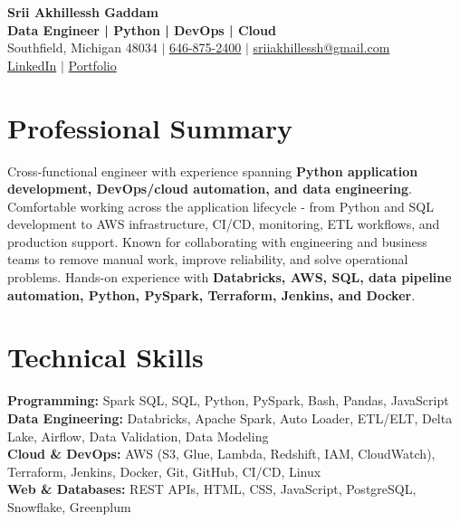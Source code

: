 \documentclass[letterpaper,10pt]{article}
\begin{document}
\fontsize{9.35pt}{10.45pt}\selectfont

\begin{center}
    {\LARGE \textbf{Srii Akhillessh Gaddam}} \\[-1pt]
    \textbf{Data Engineer | Python | DevOps | Cloud} \\[2pt]
    Southfield, Michigan 48034 $|$
    \href{tel:6468752400}{646-875-2400} $|$
    \href{mailto:sriiakhillessh@gmail.com}{sriiakhillessh@gmail.com} \\[1pt]
    \href{https://www.linkedin.com/in/srii-akhiilessh-gaddam-b48668191/}{LinkedIn} $|$
    \href{https://sriiakhillesshg.github.io/portfolio/}{Portfolio}
\end{center}
\vspace{-8pt}

\section{Professional Summary}
\small{Cross-functional engineer with experience spanning \textbf{Python application development, DevOps/cloud automation, and data engineering}. Comfortable working across the application lifecycle - from Python and SQL development to AWS infrastructure, CI/CD, monitoring, ETL workflows, and production support. Known for collaborating with engineering and business teams to remove manual work, improve reliability, and solve operational problems. Hands-on experience with \textbf{Databricks, AWS, SQL, data pipeline automation, Python, PySpark, Terraform, Jenkins, and Docker}.}

\section{Technical Skills}
\small{
\textbf{Programming:} Spark SQL, SQL, Python, PySpark, Bash, Pandas, JavaScript \\
\textbf{Data Engineering:} Databricks, Apache Spark, Auto Loader, ETL/ELT, Delta Lake, Airflow, Data Validation, Data Modeling \\
\textbf{Cloud \& DevOps:} AWS (S3, Glue, Lambda, Redshift, IAM, CloudWatch), Terraform, Jenkins, Docker, Git, GitHub, CI/CD, Linux \\
\textbf{Web \& Databases:} REST APIs, HTML, CSS, JavaScript, PostgreSQL, Snowflake, Greenplum
}

\end{document}
